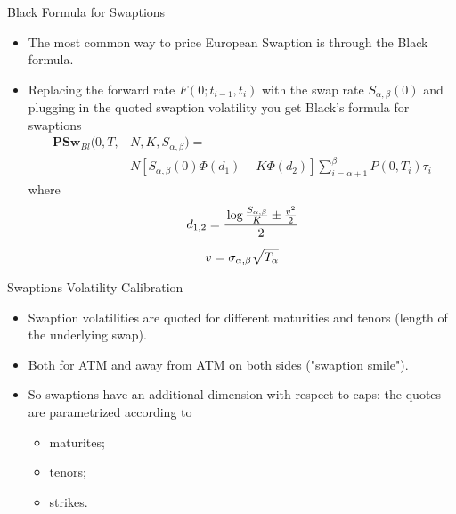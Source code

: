 \documentclass{beamer}
\begin{document}
\begin{frame}{Black Formula for Swaptions}
\begin{itemize}
	\item The most common way to price European Swaption is through the Black formula.
	\item Replacing the forward rate $F(0;t_{i-1},t_i)$ with the swap rate $S_{\alpha,\beta}(0)$ and plugging in the quoted swaption volatility you get Black's formula for swaptions
	\begin{equation}
		\boxed{\begin{aligned}
			\textbf{PSw}_{Bl}(0,T,&N,K,S_{\alpha,\beta})=\\
			&N\left[S_{\alpha,\beta}(0)\Phi(d_1)-K\Phi(d_2)\right]\sum_{i=\alpha+1}^\beta P(0,T_i)\tau_i
		\end{aligned}}
	\end{equation}
	where
	\begin{equation*}
		\begin{gathered}
		d_{1,2} = \cfrac{\log{\frac{S_{\alpha,\beta}}{K}} \pm \frac{v^2}{2}}{2}\\[0.2cm] 
		v = \sigma_{\alpha,\beta}\sqrt{T_\alpha}
		\end{gathered}
	\end{equation*}
\end{itemize}
\end{frame}

\begin{frame}{Swaptions Volatility Calibration}
\begin{itemize}
	\item Swaption volatilities are quoted for different maturities and tenors (length of the underlying swap).
	\item Both for ATM and away from ATM on both sides ("swaption smile").
	\item So swaptions have an additional dimension with respect to caps: the quotes are parametrized according to 
	\begin{itemize}
		\item maturites;
		\item tenors;
		\item strikes.
	\end{itemize}
\end{itemize}
\end{frame}
\end{document}
